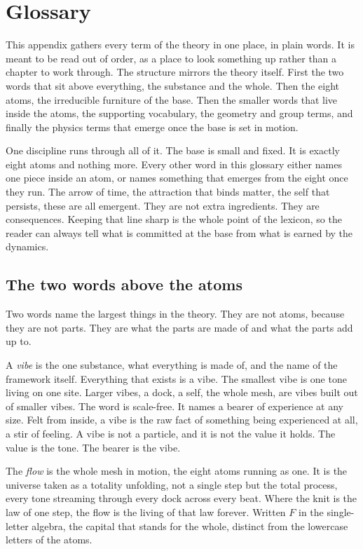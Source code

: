 \section{Glossary}

This appendix gathers every term of the theory in one place, in plain words. It is meant to be read out of order, as a place to look something up rather than a chapter to work through. The structure mirrors the theory itself. First the two words that sit above everything, the substance and the whole. Then the eight atoms, the irreducible furniture of the base. Then the smaller words that live inside the atoms, the supporting vocabulary, the geometry and group terms, and finally the physics terms that emerge once the base is set in motion.

One discipline runs through all of it. The base is small and fixed. It is exactly eight atoms and nothing more. Every other word in this glossary either names one piece inside an atom, or names something that emerges from the eight once they run. The arrow of time, the attraction that binds matter, the self that persists, these are all emergent. They are not extra ingredients. They are consequences. Keeping that line sharp is the whole point of the lexicon, so the reader can always tell what is committed at the base from what is earned by the dynamics.

\subsection{The two words above the atoms}

Two words name the largest things in the theory. They are not atoms, because they are not parts. They are what the parts are made of and what the parts add up to.

\begin{definition}[Vibe]
A \emph{vibe} is the one substance, what everything is made of, and the name of the framework itself. Everything that exists is a vibe. The smallest vibe is one tone living on one site. Larger vibes, a dock, a self, the whole mesh, are vibes built out of smaller vibes. The word is scale-free. It names a bearer of experience at any size. Felt from inside, a vibe is the raw fact of something being experienced at all, a stir of feeling. A vibe is not a particle, and it is not the value it holds. The value is the tone. The bearer is the vibe.
\end{definition}

\begin{definition}[Flow]
The \emph{flow} is the whole mesh in motion, the eight atoms running as one. It is the universe taken as a totality unfolding, not a single step but the total process, every tone streaming through every dock across every beat. Where the knit is the law of one step, the flow is the living of that law forever. Written $F$ in the single-letter algebra, the capital that stands for the whole, distinct from the lowercase letters of the atoms.
\end{definition}

